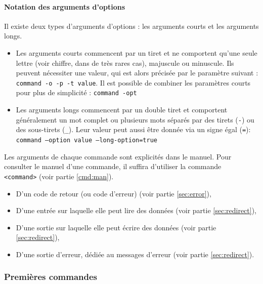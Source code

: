 \paragraph{Notation des arguments d'options}

Il existe deux types d'arguments d'options : les arguments courts et les arguments longs.
\begin{itemize}
    \item Les arguments courts commencent par un tiret et ne comportent qu'une seule lettre (voir chiffre, dans de très rares cas), majuscule ou minuscule.  Ils peuvent nécessiter une valeur, qui est alors précisée par le paramètre suivant : \texttt{command -o -p -t value}.\newline
    Il est possible de combiner les paramètres courts pour plus de simplicité : \texttt{command -opt}\vspace{\baselineskip}
    
    \item Les arguments longs commencent par un double tiret et comportent généralement un mot complet ou plusieurs mots séparés par des tirets (\texttt{-}) ou des sous-tirets (\texttt{\_}). Leur valeur peut aussi être donnée via un signe égal (\texttt{=}): \texttt{command --option value --long-option=true}
\end{itemize}
\newpage

Les arguments de chaque commande sont explicités dans le manuel. Pour consulter le manuel d'une commande, il suffira d'utiliser la commande \texttt{ <command>} (voir partie \ref{cmd:man}).

\begin{itemize}
    \item D'un code de retour (ou code d'erreur) (voir partie \ref{sec:error}),
    \item D'une entrée sur laquelle elle peut lire des données (voir partie \ref{sec:redirect}),
    \item D'une sortie sur laquelle elle peut écrire des données (voir partie \ref{sec:redirect}),
    \item D'une sortie d'erreur, dédiée au messages d'erreur (voir partie \ref{sec:redirect}).
\end{itemize}

\subsubsection{Premières commandes}

